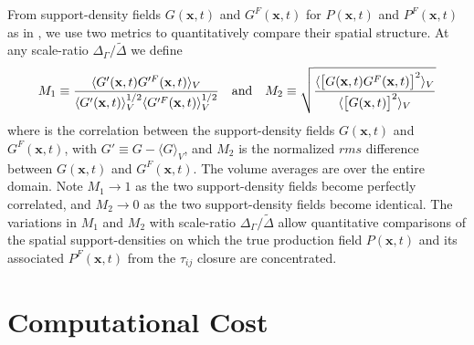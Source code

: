 From support-density fields   $G(\mathbf{x},t)$  and  $G^{F}(\mathbf{x},t)$   for   $P(\mathbf{x},t)$  and  $P^{F}(\mathbf{x},t)$    as in , we use two metrics to quantitatively compare their spatial structure. At any scale-ratio  $\Delta_{\Gamma}/\widetilde{\Delta}$ we define
%
\begin{equation}
	\label{E:11}
	M_1 \equiv \frac{\langle G'(\mathbf{x},t) G'^{F}(\mathbf{x},t)  \rangle_{V}}
	{\langle G'(\mathbf{x},t) \rangle_{V}^{1/2}  
	 \langle G'^{F}(\mathbf{x},t) \rangle_{V}^{1/2}} 
	\quad \textnormal{and} \quad
	 M_2 \equiv \sqrt{\frac{\langle \big[ G(\mathbf{x},t) G^{F}(\mathbf{x},t) \big]^{2} \rangle_{V}}
	{\langle \big[ G(\mathbf{x},t) \big]^2 \rangle_{V}}}
\end{equation}
%
%                
where   is the correlation between the support-density fields $G(\mathbf{x},t)$  and  $G^{F}(\mathbf{x},t)$, with $G' \equiv G - \langle G \rangle_V$, and $M_2$  is the normalized $rms$ difference between  $G(\mathbf{x},t)$  and  $G^{F}(\mathbf{x},t)$. The volume averages are over the entire domain. Note $M_1 \rightarrow 1$  as the two support-density fields become perfectly correlated, and  $M_2 \rightarrow 0$  as the two support-density fields become identical. The variations in  $M_1$ and $M_2$  with scale-ratio $\Delta_{\Gamma}/\widetilde{\Delta}$  allow quantitative comparisons of the spatial support-densities on which the true production field  $P(\mathbf{x},t)$  and its associated $P^{F}(\mathbf{x},t)$ from the $\tau_{ij}$  closure are concentrated. 

\section{Computational Cost}
\label{sec:IIIF}

